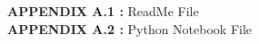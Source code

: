 \singlespacing
\textbf{APPENDIX A.1 :} ReadMe File\\
\textbf{APPENDIX A.2 :} Python Notebook File\\
\newpage